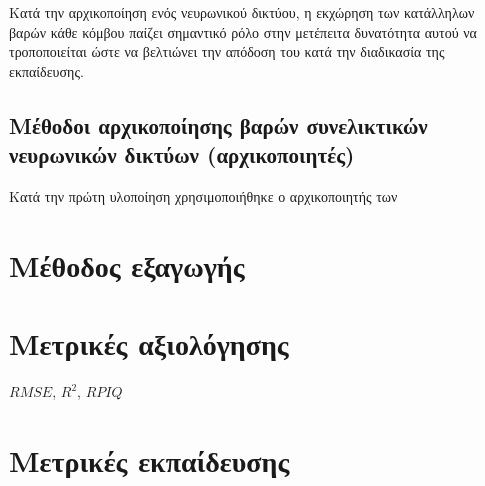 Κατά την αρχικοποίηση ενός νευρωνικού δικτύου, η εκχώρηση των κατάλληλων βαρών κάθε κόμβου παίζει σημαντικό ρόλο στην μετέπειτα δυνατότητα αυτού να τροποποιείται ώστε να βελτιώνει την απόδοση του κατά την διαδικασία της εκπαίδευσης.

\subsection{Μέθοδοι αρχικοποίησης βαρών συνελικτικών νευρωνικών δικτύων (αρχικοποιητές)}
Κατά την πρώτη υλοποίηση χρησιμοποιήθηκε ο αρχικοποιητής των 

\subsection{}


\section{Μέθοδος εξαγωγής }

\subsection{}


\section{Μετρικές αξιολόγησης}
$RMSE$, ${R^2}$, $RPIQ$ 

\section{Μετρικές εκπαίδευσης}
